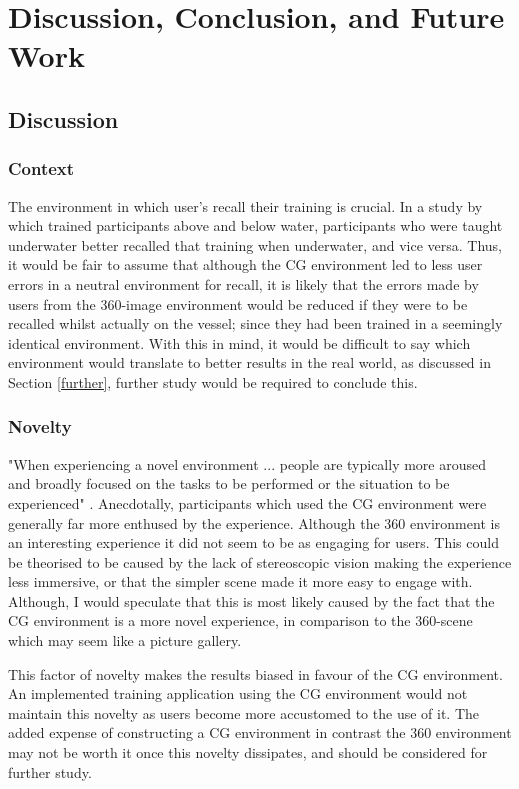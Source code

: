 \documentclass[ %
                    author={Elis Jones},
                supervisor={Dr. Kirsten Cater},
                    degree={BSc},
                     title={The Effect of Presentation Medium on Spatial Cognition},
                  subtitle={in the Virtual Environment},
                      year={2018} ]{dissertation}
\begin{document}
\chapter{Discussion, Conclusion, and Future Work}


\section{Discussion}\label{discussion}

\subsection{Context}\label{context}
The environment in which user's recall their training is crucial. In a study by \cite{Godden1975} which trained participants above and below water, participants who were taught underwater better recalled that training when underwater, and vice versa. Thus, it would be fair to assume that although the CG environment led to less user errors in a neutral environment for recall, it is likely that the errors made by users from the 360-image environment would be reduced if they were to be recalled whilst actually on the vessel; since they had been trained in a seemingly identical environment. With this in mind, it would be difficult to say which environment would translate to better results in the real world, as discussed in Section \ref{further}, further study would be required to conclude this. 

\subsection{Novelty}\label{novelty}
"When experiencing a novel environment ... people are typically more aroused and broadly focused on the tasks to be performed or the situation to be experienced" \citep{Witmer1998}. Anecdotally, participants which used the CG environment were generally far more enthused by the experience. Although the 360 environment is an interesting experience it did not seem to be as engaging for users. This could be theorised to be caused by the lack of stereoscopic vision making the experience less immersive, or that the simpler scene made it more easy to engage with. Although, I would speculate that this is most likely caused by the fact that the CG environment is a more novel experience, in comparison to the 360-scene which may seem like a picture gallery. 

This factor of novelty makes the results biased in favour of the CG environment. An implemented training application using the CG environment would not maintain this novelty as users become more accustomed to the use of it. The added expense of constructing a CG environment in contrast the 360 environment may not be worth it once this novelty dissipates, and should be considered for further study. 
\end{document}
